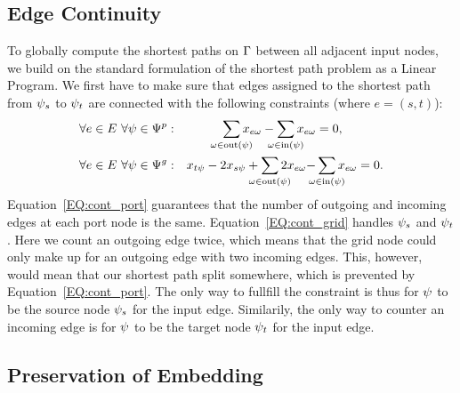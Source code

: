 \documentclass[sigconf]{acmart}
\begin{document}
\subsection{Edge Continuity}

To globally compute the shortest paths on $\Gamma$ between all adjacent input nodes, we build on the standard formulation of the shortest path problem as a Linear Program.
We first have to make sure that edges assigned to the shortest path from $\psi_s$ to $\psi_t$ are connected with the following constraints (where $e = (s, t)$):
%
\newcommand\Psum[1]{\sum_{\makebox[0pt]{$\scriptstyle#1$}}}
%
\begin{align}
	&\forall \ie \in \iE\ \forall \gv \in \gV^p:& \Psum{\ge \in \text{out}(\gv)} \geused{\ie}{\ge} - \Psum{\ge \in \text{in}(\gv)} \geused{\ie}{\ge}& = 0, \label{EQ:cont_port} \\
	&\forall \ie \in \iE\ \forall \gv \in \gV^g:& x_{t\psi} - 2x_{s\psi} + \Psum{\ge \in \text{out}(\gv)} 2\geused{\ie}{\ge} - &\Psum{\ge \in \text{in}(\gv)} \geused{\ie}{\ge} = 0. \label{EQ:cont_grid}
\end{align}
%
Equation~\ref{EQ:cont_port} guarantees that the number of outgoing and incoming edges at each port node is the same.
%
Equation~\ref{EQ:cont_grid} handles $\psi_s$ and $\psi_t$.
Here we count an outgoing edge twice, which means that the grid node could only make up for an outgoing edge with two incoming edges.
This, however, would mean that our shortest path split somewhere, which is prevented by Equation~\ref{EQ:cont_port}.
The only way to fullfill the constraint is thus for $\psi$ to be the source node $\psi_s$ for the input edge.
Similarily, the only way to counter an incoming edge is for $\psi$ to be the target node $\psi_t$ for the input edge.

\subsection{Preservation of Embedding}
\end{document}
